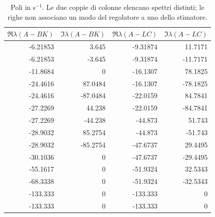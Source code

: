 \begin{table}[H]\centering\small
\begin{tabular}{rrrr}\toprule
$\Re\lambda(A-BK)$ & $\Im\lambda(A-BK)$ & $\Re\lambda(A-LC)$ & $\Im\lambda(A-LC)$ \\
\midrule
-6.21853 & 3.645 & -9.31874 & 11.7171 \\
-6.21853 & -3.645 & -9.31874 & -11.7171 \\
-11.8684 & 0 & -16.1307 & 78.1825 \\
-24.4616 & 87.0484 & -16.1307 & -78.1825 \\
-24.4616 & -87.0484 & -22.0159 & 84.7841 \\
-27.2269 & 44.238 & -22.0159 & -84.7841 \\
-27.2269 & -44.238 & -44.873 & 51.743 \\
-28.9032 & 85.2754 & -44.873 & -51.743 \\
-28.9032 & -85.2754 & -47.6737 & 29.4495 \\
-30.1036 & 0 & -47.6737 & -29.4495 \\
-55.1617 & 0 & -51.9324 & 32.5343 \\
-68.3338 & 0 & -51.9324 & -32.5343 \\
-133.333 & 0 & -133.333 & 0 \\
-133.333 & 0 & -133.333 & 0 \\
\bottomrule\end{tabular}
\caption{Poli in s$^{-1}$. Le due coppie di colonne elencano spettri distinti; le righe non associano un modo del regolatore a uno dello stimatore.}
\end{table}
